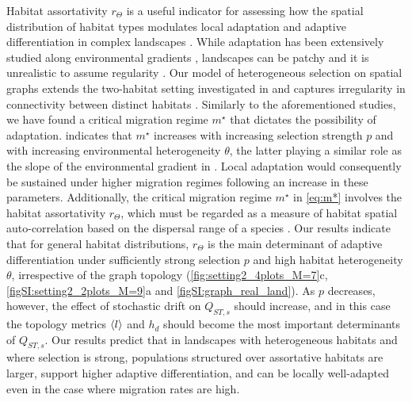 Habitat assortativity $r_\Theta$ is a useful indicator for assessing how the spatial distribution of habitat types modulates local adaptation and adaptive differentiation in complex landscapes \cite{Richardson2014}.
%
While adaptation has been extensively studied along
environmental gradients \cite{Slatkin1973,Slatkin1978,Kirkpatrick1997,Polechova2015,Polechova2018,AndradeRestrepo2019,Doebeli2003}, landscapes can be patchy and it is unrealistic to assume regularity \cite{Dale2010}.
%
Our model of heterogeneous selection on spatial graphs extends the two-habitat setting investigated in \cite{Meszena1997,Yeaman2011,Debarre2013,Mirrahimi2020} and captures irregularity in connectivity between distinct habitats \cite{Dale2010}.
% 
Similarly to the aforementioned studies, we have found a critical migration regime $m^\star$ that dictates the possibility of adaptation. 
 indicates that $m^\star$ increases with increasing selection strength $p$ and with increasing environmental heterogeneity $\theta$, the latter playing a similar role as the slope of the environmental gradient in \cite{Slatkin1973,Slatkin1978,Polechova2015,Polechova2018}. Local adaptation would consequently be sustained under higher migration regimes following an increase in these parameters.
%
Additionally, the critical migration regime $m^\star$ in \cref{eq:m*} involves the habitat assortativity $r_\Theta$, which must be regarded as a measure of habitat spatial auto-correlation based on the dispersal range of a species \cite{Richardson2014}. 
%
Our results indicate that for general habitat distributions, $r_\Theta$ is the main determinant of adaptive differentiation under sufficiently strong selection $p$ and high habitat heterogeneity $\theta$, irrespective of the graph topology (\cref{fig:setting2_4plots_M=7}c, \cref{figSI:setting2_2plots_M=9}a and \cref{figSI:graph_real_land}).
%
As $p$ decreases, however, the effect of stochastic drift on $Q_{ST,s}$ should increase, and in this case the topology metrics $\langle l \rangle$ and $h_d$ should become the most important determinants of $Q_{ST,s}$. 
%
Our results predict that in landscapes with heterogeneous habitats and where selection is strong, populations structured over assortative habitats are larger, support higher adaptive differentiation, and can be locally well-adapted even in the case where migration rates are high.

